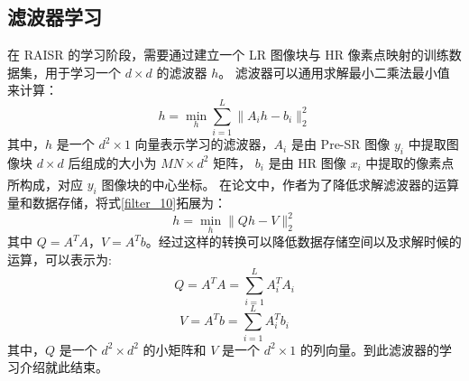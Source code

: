 \documentclass[12pt, a4paper, oneside]{ctexbook}
\begin{document}
	\subsection{滤波器学习}
	在 RAISR 的学习阶段，需要通过建立一个 LR 图像块与 HR 像素点映射的训练数据集，用于学习一个 $d\times d$ 的滤波器 $h$。
	滤波器可以通用求解最小二乘法最小值来计算：
	\begin{equation}
h=\min_h\sum_{i=1}^L\lVert{A_ih-b_i}\rVert_2^2 \label{filter_10}
	\end{equation} 
	其中，$h$ 是一个 $d^2 \times 1$ 向量表示学习的滤波器，$A_i$ 是由 Pre-SR 图像 $y_i$ 中提取图像块 $d\times d$ 后组成的大小为 $MN\times d^2$ 矩阵，
	$b_i$ 是由 HR 图像 $x_i$ 中提取的像素点所构成，对应 $y_i$ 图像块的中心坐标。
	在论文\textsuperscript{\cite{1}}中，作者为了降低求解滤波器的运算量和数据存储，将式\ref{filter_10}拓展为：
	\begin{equation}
h=\min_h\lVert Qh-V\rVert_2^2		\label{filter_11}
	\end{equation}
	其中 $Q=A^TA$，$V=A^Tb$。经过这样的转换可以降低数据存储空间以及求解时候的运算，可以表示为:
	\begin{equation}
Q=A^TA=\sum_{i=1}^LA_i^TA_i
	\end{equation}
	\begin{equation}
V=A^Tb=\sum_{i=1}^LA_i^Tb_i
	\end{equation}
其中，$Q$ 是一个 $d^2 \times d^2$ 的小矩阵和 $V$ 是一个 $d^2 \times 1$ 的列向量。到此滤波器的学习介绍就此结束。
\end{document}
